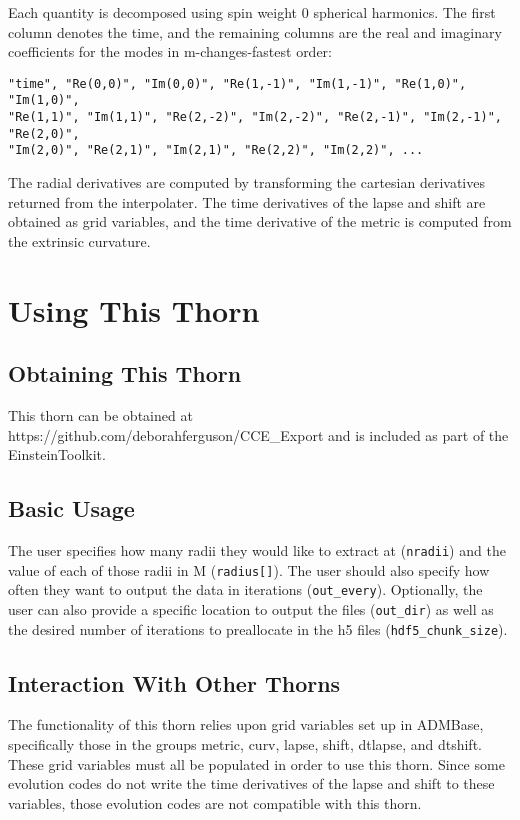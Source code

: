 \documentclass{article}
\begin{document}
Each quantity is decomposed using spin weight 0 spherical harmonics. The first column denotes the time, and the remaining
columns are the real and imaginary coefficients for the modes in m-changes-fastest order:

\begin{verbatim}
"time", "Re(0,0)", "Im(0,0)", "Re(1,-1)", "Im(1,-1)", "Re(1,0)", "Im(1,0)",
"Re(1,1)", "Im(1,1)", "Re(2,-2)", "Im(2,-2)", "Re(2,-1)", "Im(2,-1)", "Re(2,0)",
"Im(2,0)", "Re(2,1)", "Im(2,1)", "Re(2,2)", "Im(2,2)", ...
\end{verbatim}

The radial derivatives are computed by transforming the cartesian derivatives returned from the interpolater. 
The time derivatives of the lapse and shift are obtained as grid variables, and the time derivative of the metric
is computed from the extrinsic curvature. 

\section{Using This Thorn}

\subsection{Obtaining This Thorn}

This thorn can be obtained at https://github.com/deborahferguson/CCE\_Export and is included as part of the EinsteinToolkit.

\subsection{Basic Usage}

The user specifies how many radii they would like to extract at (\texttt{nradii}) and the value of each of those radii 
in M (\texttt{radius[]}). The user should also specify how often they want to output the data in iterations (\texttt{out\_every}).
Optionally, the user can also provide a specific location to output the files (\texttt{out\_dir}) as well as the desired 
number of iterations to preallocate in the h5 files (\texttt{hdf5\_chunk\_size}).

\subsection{Interaction With Other Thorns}

The functionality of this thorn relies upon grid variables set up in ADMBase, specifically those in the groups metric, curv, 
lapse, shift, dtlapse, and dtshift. These grid variables must all be populated in order to use this thorn. Since some 
evolution codes do not write the time derivatives of the lapse and shift to these variables, those evolution codes are not 
compatible with this thorn.
\end{document}
